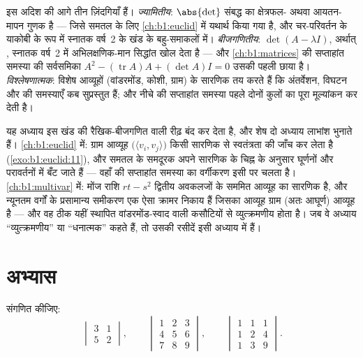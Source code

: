 \begin{remark}[सारणिक कहाँ जाते हैं]
\label{rem:b1:det:whereused}
इस अदिश की आगे तीन ज़िंदगियाँ हैं। \emph{ज्यामितीय}: $\abs{\det}$ संबद्ध
 का क्षेत्रफल- अथवा आयतन-मापन गुणक है --- जिसे समतल के लिए
\cref{ch:b1:euclid} में यथार्थ किया गया है, और चर-परिवर्तन के याकोबी के रूप
में स्नातक वर्ष~2 के खंड के बहु-समाकलों में। \emph{बीजगणितीय}: $\det(A -
\lambda I)$, अर्थात् , स्नातक वर्ष~2 में अभिलक्षणिक-मान
सिद्धांत खोल देता है --- और \cref{ch:b1:matrices} की सप्ताहांत समस्या की
सर्वसमिका $A^2 - (\operatorname{tr} A)A + (\det A)I = 0$ उसकी पहली छाया है।
\emph{विश्लेषणात्मक}: विशेष आव्यूहों (वांडरमोंड, कोशी, ग्राम) के सारणिक तय
करते हैं कि अंतर्वेशन, विघटन और  की समस्याएँ कब सुप्रस्तुत हैं; और
नीचे की सप्ताहांत समस्या पहले दोनों कुलों का पूरा मूल्यांकन कर देती है।
\end{remark}

\begin{remark}[पुस्तक 3 के भीतर के परिदृश्य]
\label{rem:b1:det:perspectives}
यह अध्याय इस खंड की रैखिक-बीजगणित वाली रीढ़ बंद कर देता है, और शेष दो अध्याय
लाभांश भुनाते हैं। \cref{ch:b1:euclid} में: ग्राम आव्यूह $\bigl(\langle v_i,
v_j\rangle\bigr)$ किसी सारणिक से स्वतंत्रता की जाँच कर लेता है
(\cref{exo:b1:euclid:11}), और समतल के समदूरक अपने सारणिक के चिह्न के अनुसार
घूर्णनों और परावर्तनों में बँट जाते हैं --- वहाँ की सप्ताहांत समस्या का
वर्गीकरण इसी पर चलता है। \cref{ch:b1:multivar} में: मोंज राशि $rt - s^2$
द्वितीय अवकलजों के सममित आव्यूह का सारणिक है, और न्यूनतम वर्गों के
प्रसामान्य समीकरण एक ऐसा क्रामर निकाय हैं जिसका आव्यूह ग्राम (अतः आघूर्ण)
आव्यूह है --- और वह ठीक यहीं स्थापित वांडरमोंड-स्वाद वाली कसौटियों से
व्युत्क्रमणीय होता है। जब वे अध्याय ``व्युत्क्रमणीय'' या ``धनात्मक'' कहते
हैं, तो उसकी रसीदें इसी अध्याय में हैं।
\end{remark}

\section{अभ्यास}

\begin{exercise}[$\star$]\label{exo:b1:det:1}
संगणित कीजिए:
\[
\begin{vmatrix} 3 & 1\\ 5 & 2 \end{vmatrix},
\qquad
\begin{vmatrix} 1 & 2 & 3\\ 4 & 5 & 6\\ 7 & 8 & 9\end{vmatrix},
\qquad
\begin{vmatrix} 1 & 1 & 1\\ 1 & 2 & 4\\ 1 & 3 & 9\end{vmatrix}.
\]
\end{exercise}

